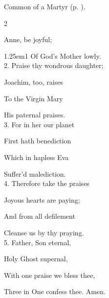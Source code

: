 
\begin{rubric}
	Common of a Martyr (p. \pageref{CommonMartyrNotBishopCollect}).
\end{rubric}


\clearpage
{}

\begin{paracol}{2}
\sloppy

\firstEvensong
{}

\firstEvensongHymn
{} Anne, be joyful;



\begin{hangparas}{1.25em}{1}
Of God's Mother lowly.\\

2. Praise thy wondrous daughter;

Joachim, too, raises

To the Virgin Mary

His paternal praises.\\

3. For in her our planet

First hath benediction

Which in hapless Eva

Suffer'd malediction.\\

4. Therefore take the praises

Joyous hearts are paying;

And from all defilement

Cleanse us by thy praying.\\

5. Father, Son eternal,

Holy Ghost supernal,

With one praise we bless thee,

Three in One confess thee. Amen.\\
\end{hangparas}


\end{paracol}

